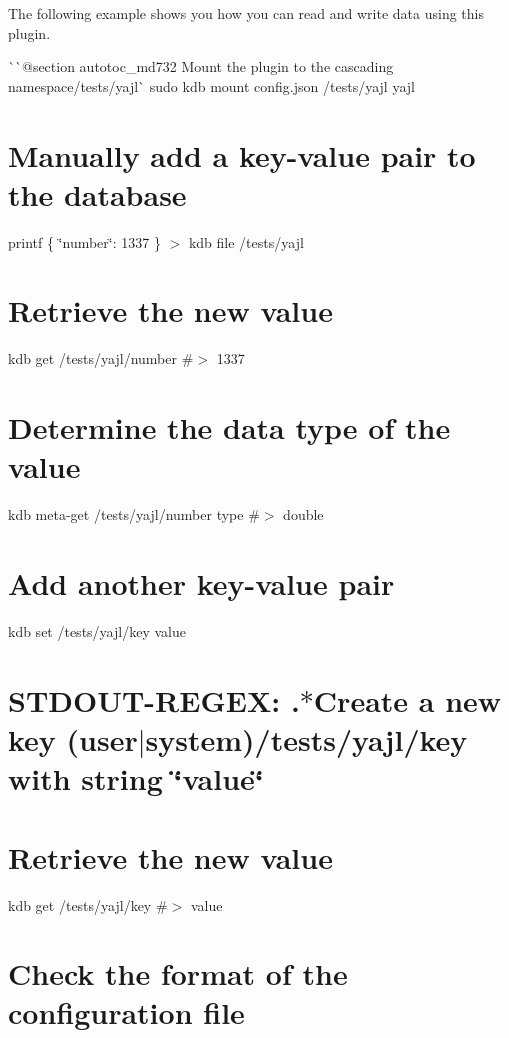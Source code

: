 The following example shows you how you can read and write data using this plugin.

\`{}\`{}{\ttfamily  @section autotoc\+\_\+md732 Mount the plugin to the cascading namespace}/tests/yajl\`{} sudo kdb mount config.\+json /tests/yajl yajl\hypertarget{autotoc_md726_autotoc_md733}{}\section{Manually add a key-\/value pair to the database}\label{autotoc_md726_autotoc_md733}
printf \textquotesingle{}\{ \char`\"{}number\char`\"{}\+: 1337 \}\textquotesingle{} $>$ {\ttfamily kdb file /tests/yajl}\hypertarget{autotoc_md726_autotoc_md734}{}\section{Retrieve the new value}\label{autotoc_md726_autotoc_md734}
kdb get /tests/yajl/number \#$>$ 1337\hypertarget{autotoc_md726_autotoc_md735}{}\section{Determine the data type of the value}\label{autotoc_md726_autotoc_md735}
kdb meta-\/get /tests/yajl/number type \#$>$ double\hypertarget{autotoc_md726_autotoc_md736}{}\section{Add another key-\/value pair}\label{autotoc_md726_autotoc_md736}
kdb set /tests/yajl/key value \hypertarget{autotoc_md726_autotoc_md737}{}\section{S\+T\+D\+O\+U\+T-\/\+R\+E\+G\+E\+X\+: .$\ast$\+Create a new key (user$\vert$system)/tests/yajl/key with string \char`\"{}value\char`\"{}}\label{autotoc_md726_autotoc_md737}
\hypertarget{autotoc_md726_autotoc_md738}{}\section{Retrieve the new value}\label{autotoc_md726_autotoc_md738}
kdb get /tests/yajl/key \#$>$ value\hypertarget{autotoc_md726_autotoc_md739}{}\section{Check the format of the configuration file}\label{autotoc_md726_autotoc_md739}
